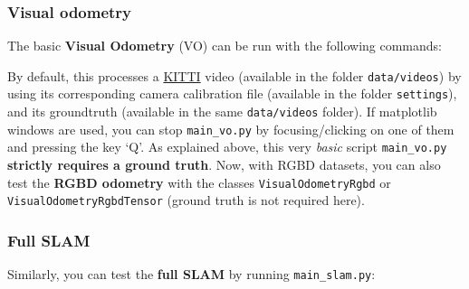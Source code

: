 \documentclass{article}
\newenvironment{Shaded}{\begin{snugshade}}{\end{snugshade}}
\newcommand{\BuiltInTok}[1]{\textcolor[rgb]{0.74,0.68,0.62}{#1}}
\newcommand{\CommentTok}[1]{\textcolor[rgb]{0.00,0.40,1.00}{\textbf{\textit{#1}}}}
\newcommand{\ExtensionTok}[1]{\textcolor[rgb]{0.74,0.68,0.62}{#1}}
\newcommand{\NormalTok}[1]{\textcolor[rgb]{0.74,0.68,0.62}{#1}}
\begin{document}
\hypertarget{visual-odometry}{%
\subsubsection{Visual odometry}\label{visual-odometry}}

The basic \textbf{Visual Odometry} (VO) can be run with the following
commands:

\begin{scriptsize}
\begin{Shaded}
\end{Shaded}
\end{scriptsize}


By default, this processes a
\href{http://www.cvlibs.net/datasets/kitti/eval_odometry.php}{KITTI}
video (available in the folder \texttt{data/videos}) by using its
corresponding camera calibration file (available in the folder
\texttt{settings}), and its groundtruth (available in the same
\texttt{data/videos} folder). If matplotlib windows are used, you can
stop \texttt{main\_vo.py} by focusing/clicking on one of them and
pressing the key `Q'. As explained above, this very \emph{basic} script
\texttt{main\_vo.py} \textbf{strictly requires a ground truth}. Now,
with RGBD datasets, you can also test the \textbf{RGBD odometry} with
the classes \texttt{VisualOdometryRgbd} or
\texttt{VisualOdometryRgbdTensor} (ground truth is not required here).

\hypertarget{full-slam}{%
\subsubsection{Full SLAM}\label{full-slam}}

Similarly, you can test the \textbf{full SLAM} by running
\texttt{main\_slam.py}:\\

\begin{scriptsize}
\begin{Shaded}
\end{Shaded}
\end{scriptsize}
\end{document}
